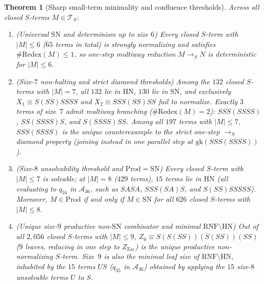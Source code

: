 \documentclass[11pt,reqno]{amsart}
\numberwithin{equation}{section}
\theoremstyle{plain}
\newtheorem{theorem}{Theorem}[section]
\theoremstyle{definition}
\theoremstyle{remark}
\newcommand{\TS}{\mathcal{T}_S}
\newcommand{\RNF}{\mathrm{RNF}}
\newcommand{\SN}{\mathrm{SN}}
\newcommand{\HN}{\mathrm{HN}}
\newcommand{\Prod}{\mathrm{Prod}}
\newcommand{\redS}{\to_S}
\begin{document}
\begin{theorem}[Sharp small-term minimality and confluence thresholds]
\label{thm:small-term-minimality}
Across all closed $S$-terms $M \in \TS$:
\begin{enumerate}[label=(\roman*),leftmargin=2.2em]
\item \emph{(Universal $\SN$ and determinism up to size $6$)} Every closed $S$-term with $|M| \le 6$ ($65$ terms in total) is strongly normalizing and satisfies $\#\mathrm{Redex}(M) \le 1$, so one-step multiway reduction $M \redS N$ is deterministic for $|M| \le 6$.
\item \emph{(Size-$7$ non-halting and strict diamond thresholds)} Among the $132$ closed $S$-terms with $|M| = 7$, all $132$ lie in $\HN$, $130$ lie in $\SN$, and exclusively $X_1 \equiv S(S S)S S S S$ and $X_2 \equiv S S S (S S) S S$ fail to normalize. Exactly $3$ terms of size~$7$ admit multiway branching ($\#\mathrm{Redex}(M) = 2$): $S S S (S S S S)$, $S S (S S S S) S$, and $S(S S S S) S S$. Among all $197$ terms with $|M| \le 7$, $S S S (S S S S)$ is the unique counterexample to the strict one-step $\redS$ diamond property (joining instead in one parallel step at $\mathrm{gk}(S S S (S S S S))$).
\item \emph{(Size-$8$ unsolvability threshold and $\Prod = \SN$)} Every closed $S$-term with $|M| \le 7$ is solvable; at $|M| = 8$ ($429$ terms), $15$ terms lie in $\overline{\HN}$ (all evaluating to $q_{34}$ in $\mathcal{A}_{36}$, such as $S A S A$, $S S S(S A)S$, and $S(S S)S S S S S$). Moreover, $M \in \Prod$ if and only if $M \in \SN$ for all $626$ closed $S$-terms with $|M| \le 8$.
\item \emph{(Unique size-$9$ productive non-$\SN$ combinator and minimal $\RNF \setminus \HN$)} Out of all $2{,}056$ closed $S$-terms with $|M| \le 9$, $Z_0 \equiv S(S(S S))(S(S S))(S S)$ ($9$ leaves, reducing in one step to $Z_{\mathrm{Zac}}$) is the \emph{unique} productive non-normalizing $S$-term. Size~$9$ is also the minimal leaf size of $\RNF \setminus \HN$, inhabited by the $15$ terms $U S$ ($q_{35}$ in $\mathcal{A}_{36}$) obtained by applying the $15$ size-$8$ unsolvable terms $U$ to $S$.
\end{enumerate}
\end{theorem}
\end{document}
